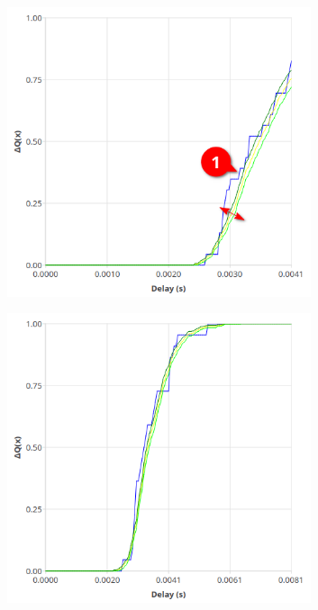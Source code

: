 \begin{figure}[H]
            \centering
            \begin{subfigure}{.5\textwidth}
                \centering
                \includegraphics[width=0.98\textwidth]{img/overload_2/worker_1a.png}
                \label{fig:w14}
            \end{subfigure}%
            \begin{subfigure}{.5\textwidth}
                \centering
                \includegraphics[width =0.98\textwidth]{img/overload_2/worker_1_8.png}

\end{subfigure}
\end{figure}
